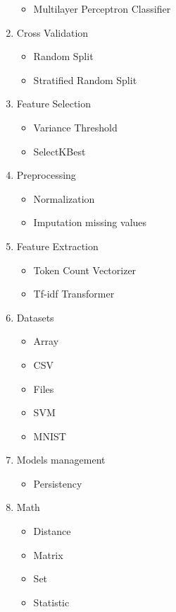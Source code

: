 \begin{enumerate}
\begin{itemize}
\item Multilayer Perceptron Classifier
\end{itemize}
\item Cross Validation
\begin{itemize}
\item Random Split
\item Stratified Random Split
\end{itemize}
\item Feature Selection
\begin{itemize}
\item Variance Threshold
\item SelectKBest
\end{itemize}
\item Preprocessing
\begin{itemize}
\item Normalization
\item Imputation missing values
\end{itemize}
\item Feature Extraction
\begin{itemize}
\item Token Count Vectorizer
\item Tf-idf Transformer
\end{itemize}
\item Datasets
\begin{itemize}
\item Array
\item CSV
\item Files
\item SVM
\item MNIST
\end{itemize}
\item Models management
\begin{itemize}
\item Persistency
\end{itemize}
\item Math
\begin{itemize}
\item Distance
\item Matrix
\item Set
\item Statistic
\end{itemize}
\end{enumerate}


